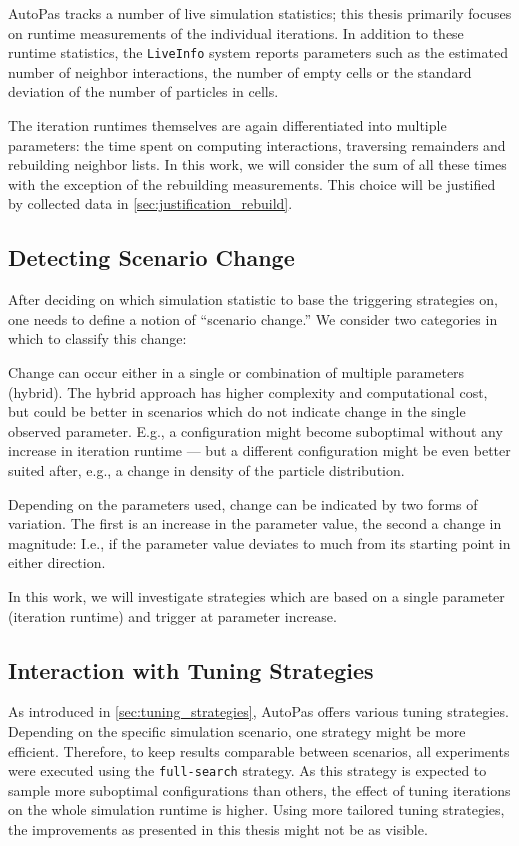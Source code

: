 AutoPas tracks a number of live simulation statistics; this thesis primarily focuses on runtime measurements of the individual iterations.
In addition to these runtime statistics, the \texttt{LiveInfo} system reports parameters such as the estimated number of neighbor interactions, the number of empty cells or the standard deviation of the number of particles in cells. \cite{Newcome2025}

The iteration runtimes themselves are again differentiated into multiple parameters: the time spent on computing interactions, traversing remainders and rebuilding neighbor lists.
In this work, we will consider the sum of all these times with the exception of the rebuilding measurements. This choice will be justified by collected data in \autoref{sec:justification_rebuild}.

\subsection{Detecting Scenario Change}
After deciding on which simulation statistic to base the triggering strategies on, one needs to define a notion of \enquote{scenario change.} We consider two categories in which to classify this change:

\begin{description}[leftmargin=!,labelwidth=\widthof{\textbf{Type of variation }}]
	\item[\textbf{Parameter Space}] Change can occur either in a single or combination of multiple parameters (hybrid). The hybrid approach has higher complexity and computational cost, but could be better in scenarios which do not indicate change in the single observed parameter. E.g., a configuration might become suboptimal without any increase in iteration runtime --- but a different configuration might be even better suited after, e.g., a change in density of the particle distribution.
	\item[\textbf{Type of Variation}] Depending on the parameters used, change can be indicated by two forms of variation. The first is an increase in the parameter value, the second a change in magnitude: I.e., if the parameter value deviates to much from its starting point in either direction.
\end{description}

In this work, we will investigate strategies which are based on a single parameter (iteration runtime) and trigger at parameter increase.


\subsection{Interaction with Tuning Strategies}
As introduced in \autoref{sec:tuning_strategies}, AutoPas offers various tuning strategies. Depending on the specific simulation scenario, one strategy might be more efficient. Therefore, to keep results comparable between scenarios, all experiments were executed using the \texttt{full-search} strategy. As this strategy is expected to sample more suboptimal configurations than others, the effect of tuning iterations on the whole simulation runtime is higher. Using more tailored tuning strategies, the improvements as presented in this thesis might not be as visible.


